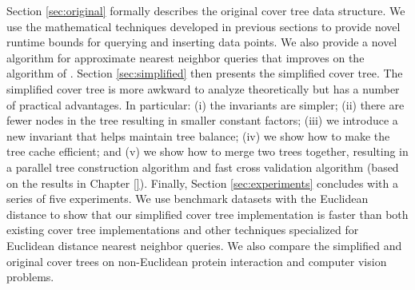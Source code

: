 \documentclass[thesis.tex]{subfiles}
\begin{document}
Section \ref{sec:original} formally describes the original cover tree data structure.
We use the mathematical techniques developed in previous sections to provide novel runtime bounds for querying and inserting data points.
We also provide a novel algorithm for approximate nearest neighbor queries that improves on the algorithm of \cite{beygelzimer2006cover}.
Section \ref{sec:simplified} then presents the simplified cover tree.
The simplified cover tree is more awkward to analyze theoretically but has a number of practical advantages.
In particular:
(i) the invariants are simpler;
(ii) there are fewer nodes in the tree resulting in smaller constant factors;
(iii) we introduce a new invariant that helps maintain tree balance;
(iv) we show how to make the tree cache efficient;
and (v) we show how to merge two trees together, resulting in a parallel tree construction algorithm and fast cross validation algorithm (based on the results in Chapter \ref{}).
Finally, Section \ref{sec:experiments} concludes with a series of five experiments.
We use benchmark datasets with the Euclidean distance to show that our simplified cover tree implementation is faster than both existing cover tree implementations and other techniques specialized for Euclidean distance nearest neighbor queries.
We also compare the simplified and original cover trees on non-Euclidean protein interaction and computer vision problems.


%
%
%
%
%
\end{document}
